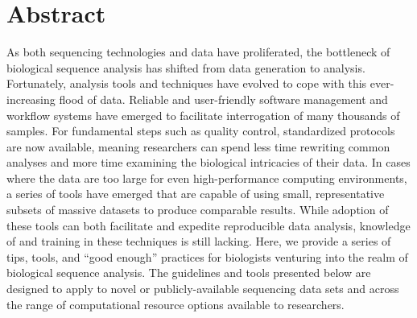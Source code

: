 \documentclass[10pt,letterpaper]{article}
\begin{document}
\section*{Abstract}
As both sequencing technologies and data have proliferated, the bottleneck of biological sequence analysis has shifted from data generation to analysis. 
Fortunately, analysis tools and techniques have evolved to cope with this ever-increasing flood of data. 
Reliable and user-friendly software management and workflow systems have emerged to facilitate interrogation of many thousands of samples. 
For fundamental steps such as quality control, standardized protocols are now available, meaning researchers can spend less time rewriting common analyses and more time examining the biological intricacies of their data. 
In cases where the data are too large for even high-performance computing environments, a series of tools have emerged that are capable of using small, representative subsets of massive datasets to produce comparable results. 
While adoption of these tools can both facilitate and expedite reproducible data analysis, knowledge of and training in these techniques is still lacking. 
Here, we provide a series of tips, tools, and “good enough” practices for biologists venturing into the realm of biological sequence analysis.
The guidelines and tools presented below are designed to apply to novel or publicly-available sequencing data sets and across the range of computational resource options available to researchers.



\end{document}
